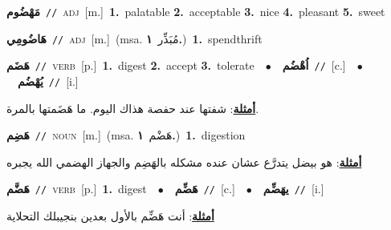 \documentclass[10pt,a4paper,twoside]{article} %
\begin{document}
\begin{multicols}{2}
{\setlength\topsep{0pt}\textbf{\foreignlanguage{arabic}{مَهْضُوم}}\ {\color{gray}\texttt{//}\color{black}}\ \textsc{adj}\ [m.]\ \textbf{1.}~palatable  \textbf{2.}~acceptable  \textbf{3.}~nice  \textbf{4.}~pleasant  \textbf{5.}~sweet\ } \vspace{2mm}

{\setlength\topsep{0pt}\textbf{\foreignlanguage{arabic}{هَاضُومِي}}\ {\color{gray}\texttt{//}\color{black}}\ \textsc{adj}\ [m.]\ \color{gray}(msa. \foreignlanguage{arabic}{مُبَذِّر}~\foreignlanguage{arabic}{\textbf{١.}})\color{black}\ \textbf{1.}~spendthrift\ } \vspace{2mm}

{\setlength\topsep{0pt}\textbf{\foreignlanguage{arabic}{هَضَم}}\ {\color{gray}\texttt{//}\color{black}}\ \textsc{verb}\ [p.]\ \textbf{1.}~digest  \textbf{2.}~accept  \textbf{3.}~tolerate\ \ $\bullet$\ \ \setlength\topsep{0pt}\textbf{\foreignlanguage{arabic}{اُهْضُم}}\ {\color{gray}\texttt{//}\color{black}}\ [c.]\ \ $\bullet$\ \ \setlength\topsep{0pt}\textbf{\foreignlanguage{arabic}{يُهْضُم}}\ {\color{gray}\texttt{//}\color{black}}\ [i.]\  \begin{flushright}\color{gray}\foreignlanguage{arabic}{\textbf{\underline{\foreignlanguage{arabic}{أمثلة}}}: شفتها عند حفصة هذاك اليوم. ما هَضَمتها بالمرة.}\end{flushright}\color{black}} \vspace{2mm}

{\setlength\topsep{0pt}\textbf{\foreignlanguage{arabic}{هَضِم}}\ {\color{gray}\texttt{//}\color{black}}\ \textsc{noun}\ [m.]\ \color{gray}(msa. \foreignlanguage{arabic}{هَضْم}~\foreignlanguage{arabic}{\textbf{١.}})\color{black}\ \textbf{1.}~digestion\  \begin{flushright}\color{gray}\foreignlanguage{arabic}{\textbf{\underline{\foreignlanguage{arabic}{أمثلة}}}: هو بيضل يتدرَّع عشان عنده مشكله بالهَضِم والجهاز الهضمي الله يجبره}\end{flushright}\color{black}} \vspace{2mm}

{\setlength\topsep{0pt}\textbf{\foreignlanguage{arabic}{هَضَّم}}\ {\color{gray}\texttt{//}\color{black}}\ \textsc{verb}\ [p.]\ \textbf{1.}~digest\ \ $\bullet$\ \ \setlength\topsep{0pt}\textbf{\foreignlanguage{arabic}{هَضِّم}}\ {\color{gray}\texttt{//}\color{black}}\ [c.]\ \ $\bullet$\ \ \setlength\topsep{0pt}\textbf{\foreignlanguage{arabic}{يهَضِّم}}\ {\color{gray}\texttt{//}\color{black}}\ [i.]\  \begin{flushright}\color{gray}\foreignlanguage{arabic}{\textbf{\underline{\foreignlanguage{arabic}{أمثلة}}}: أنت هَضِّم بالأول بعدين بنجيبلك التحلاية}\end{flushright}\color{black}} \vspace{2mm}


\end{multicols}
\end{document}
